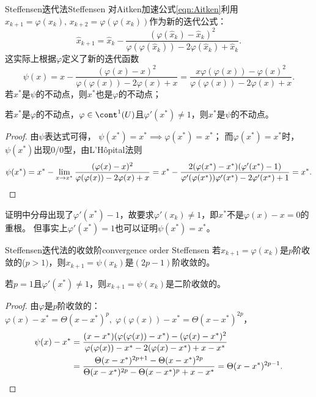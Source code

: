 \begin{theorem}
    {Steffensen迭代法}{Steffensen}
    对Aitken加速公式\eqref{eqn:Aitken}利用$x_{k+1}=\varphi(x_k),\,x_{k+2}=\varphi(\varphi(x_k))$作为新的迭代公式：
    \[
        \hat x_{k+1}=\hat x_k-\frac{(\varphi(\hat x_k)-\hat x_k)^2}{\varphi(\varphi(\hat x_k))-2\varphi(\hat x_k)+\hat x_k}.
    \]
    这实际上根据$\varphi$定义了新的迭代函数
    \begin{equation}
        \psi(x)=x-\frac{(\varphi(x)-x)^2}{\varphi(\varphi(x))-2\varphi(x)+x}=\frac{x\varphi(\varphi(x))-\varphi(x)^2}{\varphi(\varphi(x))-2\varphi(x)+x}.
    \end{equation}
    若$x^*$是$\psi$的不动点，则$x^*$也是$\varphi$的不动点；

    若$x^*$是$\varphi$的不动点，$\varphi\in\cont^1(U)$且$\varphi'(x^*)\neq 1$，则$x^*$是$\psi$的不动点。
\end{theorem}

\begin{proof}
    由$\psi$表达式可得，
    $\psi(x^*)=x^*\implies\varphi(x^*)=x^*$；
    而$\varphi(x^*)=x^*$时，$\psi(x^*)$出现0/0型，由L'H\^opital法则
    \[
        \psi(x^*)=x^*-\lim_{x\to x^*}\frac{(\varphi(x)-x)^2}{\varphi(\varphi(x))-2\varphi(x)+x}=x^*-\frac{2(\varphi(x^*)-x^*)(\varphi'(x^*)-1)}{\varphi'(\varphi(x^*))\varphi'(x^*)-2\varphi'(x^*)+1}=x^*.
        \qedhere
    \]
\end{proof}

\begin{remark}
    证明中分母出现了$\varphi'(x^*)-1$，故要求$\varphi'(x_k)\neq 1$，即$x^*$不是$\varphi(x)-x=0$的重根。
    但事实上$\varphi'(x^*)=1$也可以证明$\psi(x^*)=x^*$。
\end{remark}

\begin{theorem}
    {Steffensen迭代法的收敛阶}{convergence order Steffensen}
    若$x_{k+1}=\varphi(x_k)$是$p$阶收敛的($p>1)$，则$x_{k+1}=\psi(x_k)$是$(2p-1)$阶收敛的。

    若$p=1$且$\varphi'(x^*)\neq 1$，则$x_{k+1}=\psi(x_k)$是二阶收敛的。
\end{theorem}

\begin{proof}
    由$\varphi$是$p$阶收敛的：$\varphi(x)-x^*=\Theta(x-x^*)^p,\;\varphi(\varphi(x))-x^*=\Theta(x-x^*)^{2p}$，
    \begin{align*}
        \psi(x)-x^*&=\frac{(x-x^*)(\varphi(\varphi(x))-x^*)-(\varphi(x)-x^*)^2}{\varphi(\varphi(x))-x^*-2(\varphi(x)-x^*)+x-x^*}\\
        &=\frac{\Theta(x-x^*)^{2p+1}-\Theta(x-x^*)^{2p}}{\Theta(x-x^*)^{2p}-\Theta(x-x^*)^p+x-x^*}=\Theta(x-x^*)^{2p-1}.
        \qedhere
    \end{align*}
\end{proof}

